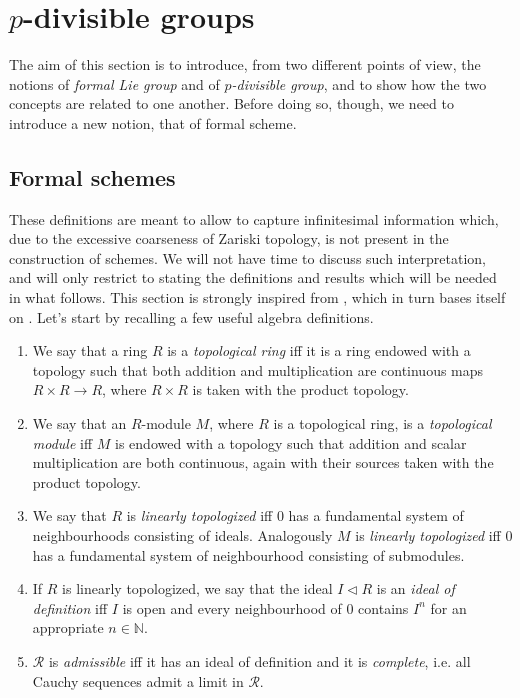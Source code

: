 \section{\texorpdfstring{$p$}{p}-divisible groups}
The aim of this section is to introduce, from two different points of view,
the notions of \emph{formal Lie group}
and of \emph{$p$-divisible group},
and to show how the two concepts are related to one another.
Before doing so, though, we need to introduce a new notion, that
of formal scheme.


\subsection{Formal schemes}
These definitions are meant to allow to capture infinitesimal
information which, due to the excessive coarseness of Zariski topology,
is not present in the construction of schemes.
We will not have time to discuss such interpretation, and will
only restrict to stating the definitions and results which will
be needed in what follows.
This section is strongly inspired from 
\cite[\href{https://stacks.math.columbia.edu/tag/0AHY}{Section 0AHY}]{SP},
which in turn bases itself on \cite[Chapter I, \S10]{EGA}.
Let's start by recalling a few useful algebra definitions.


\begin{defn}\leavevmode\vspace{-1\baselineskip}
\begin{enumerate}
\item We say that a ring $R$ is a \emph{topological ring} iff it is a ring endowed with a topology
	such that both addition and multiplication are continuous maps
	$R \times R \to R$, where $R \times R$ is taken with the product topology.

\item We say that an $R$-module $M$, where $R$ is a topological ring,
	is a \emph{topological module} iff $M$ is endowed with a topology such that
	addition and scalar multiplication are both continuous, again with their sources
	taken with the product topology.

\item We say that $R$ is \emph{linearly topologized} iff $0$ has a fundamental system
	of neighbourhoods consisting of ideals.
	Analogously $M$ is \emph{linearly topologized} iff $0$ has a fundamental
	system of neighbourhood consisting of submodules.

\item If $R$ is linearly topologized, we say that the ideal $I \triangleleft R$
	is an \emph{ideal of definition} iff $I$ is open and every neighbourhood
	of $0$ contains $I^n$ for an appropriate $n \in \mathbb{N}$.

\item $\mathscr{R}$ is \emph{admissible} iff it has an ideal of definition and it is \emph{complete},
	i.e$.$ all Cauchy sequences admit a limit in \(\mathscr{R}\).
\end{enumerate}
\end{defn}


